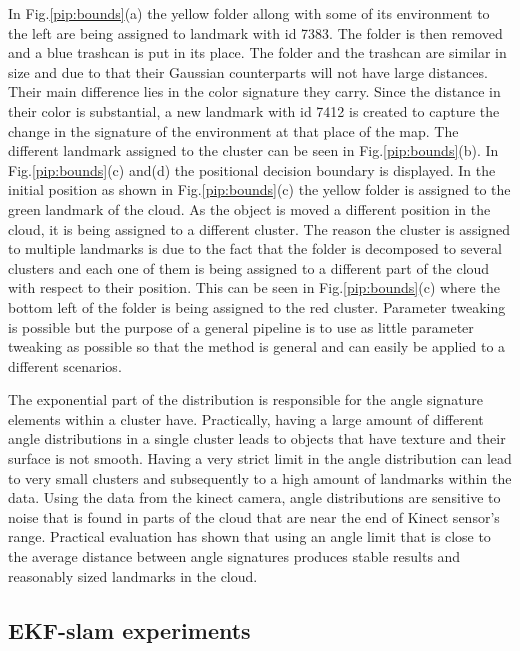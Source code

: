 \documentclass[]{article}
\begin{document}
    In Fig.\ref{pip:bounds}(a) the yellow folder allong with some of its environment to the left are being assigned to landmark with id 7383. The folder is then removed and a blue trashcan is put in its place. The folder and the trashcan are similar in size and due to that their Gaussian counterparts will not have large distances. Their main difference lies in the color signature they carry. Since the distance in their color is substantial, a new landmark with id 7412 is created to capture the change in the signature of the environment at that place of the map. The different landmark assigned to the cluster can be seen in Fig.\ref{pip:bounds}(b). In Fig.\ref{pip:bounds}(c) and(d) the positional decision boundary is displayed. In the initial position as shown in Fig.\ref{pip:bounds}(c) the yellow folder is assigned to the green landmark of the cloud. As the object is moved a different position in the cloud, it is being assigned to a different cluster. The reason the cluster is assigned to multiple landmarks is due to the fact that the folder is decomposed to several clusters and each one of them is being assigned to a different part of the cloud with respect to their position. This can be seen in Fig.\ref{pip:bounds}(c) where the bottom left of the folder is being assigned to the red cluster. Parameter tweaking is possible but the purpose of a general pipeline is to use as little parameter tweaking as possible so that the method is general and can easily be applied to a different scenarios.


    The exponential part of the distribution is responsible for the angle signature elements within a cluster have. Practically, having a large amount of different angle distributions in a single cluster leads to objects that have texture and their surface is not smooth. Having a very strict limit in the angle distribution can lead to very small clusters and subsequently to a high amount of landmarks within the data. Using the data from the kinect camera, angle distributions are sensitive to noise that is found in parts of the cloud that are near the end of Kinect sensor's range. Practical evaluation has shown that using an angle limit that is close to the average distance between angle signatures produces stable results and reasonably sized landmarks in the cloud.

    \subsection{EKF-slam experiments}
\end{document}
